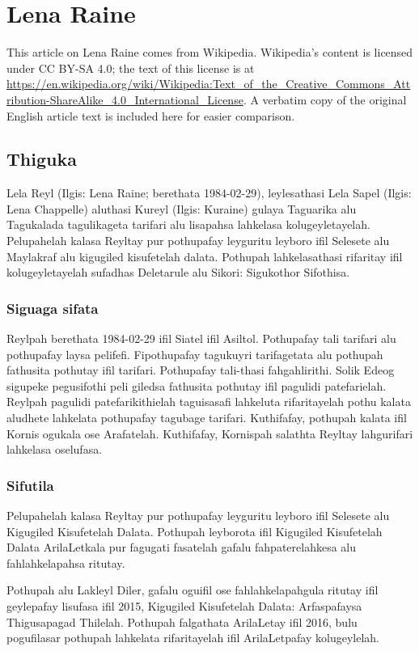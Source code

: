 \chapter{Lena Raine}
This article on Lena Raine comes from Wikipedia. Wikipedia's content is licensed under CC BY-SA 4.0; the text of this license is at \url{https://en.wikipedia.org/wiki/Wikipedia:Text_of_the_Creative_Commons_Attribution-ShareAlike_4.0_International_License}. A verbatim copy of the original English article text is included here for easier comparison.

\section{Thiguka}
Lela Reyl (Ilgis: Lena Raine; berethata 1984-02-29), leylesathasi Lela Sapel (Ilgis: Lena Chappelle) aluthasi Kureyl (Ilgis: Kuraine) gulaya Taguarika alu Tagukalada tagulikageta tarifari alu lisapahsa lahkelasa kolugeyletayelah.
Pelupahelah kalasa Reyltay pur pothupafay leyguritu leyboro ifil Selesete alu Maylakraf alu kigugiled kisufetelah dalata.
Pothupah lahkelasathasi rifaritay ifil kolugeyletayelah sufadhas Deletarule alu Sikori: Sigukothor Sifothisa. 

\subsection{Siguaga sifata}
Reylpah berethata 1984-02-29 ifil Siatel ifil Asiltol.
Pothupafay tali tarifari alu pothupafay laysa pelifefi.
Fipothupafay tagukuyri tarifagetata alu pothupah fathusita pothutay ifil tarifari.
Pothupafay tali-thasi fahgahlirithi.
Solik Edeog sigupeke pegusifothi peli giledsa fathusita pothutay ifil pagulidi patefarielah.
Reylpah pagulidi patefarikithielah taguisasafi lahkeluta rifaritayelah pothu kalata aludhete lahkelata pothupafay tagubage tarifari.
Kuthifafay, pothupah kalata ifil Kornis ogukala ose Arafatelah.
Kuthifafay, Kornispah salathta Reyltay lahgurifari lahkelasa oselufasa.

\subsection{Sifutila}
Pelupahelah kalasa Reyltay pur pothupafay leyguritu leyboro ifil Selesete alu Kigugiled Kisufetelah Dalata. 
Pothupah leyborota ifil Kigugiled Kisufetelah Dalata ArilaLetkala pur fagugati fasatelah gafalu fahpaterelahkesa alu fahlahkelapahsa ritutay.

Pothupah alu Lakleyl Diler, gafalu oguifil ose fahlahkelapahgula ritutay ifil geylepafay lisufasa ifil 2015, Kigugiled Kisufetelah Dalata: Arfaspafaysa Thigusapagad Thilelah.
Pothupah falgathata ArilaLetay ifil 2016, bulu pogufilasar pothupah lahkelata rifaritayelah ifil ArilaLetpafay kolugeylelah.

